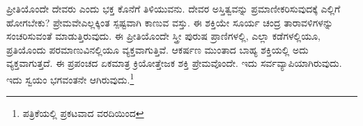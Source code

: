 ಪ್ರೀತಿಯೊಂದೇ ದೇವರು ಎಂದು ಭಕ್ತ ಕೊನೆಗೆ ತಿಳಿಯುವನು. ದೇವರ ಅಸ್ತಿತ್ವವನ್ನು ಪ್ರಮಾಣೀಕರಿಸುವುದಕ್ಕೆ ಎಲ್ಲಿಗೆ ಹೋಗಬೇಕು? ಪ್ರೇಮವೇ\break ಎಲ್ಲಕ್ಕಿಂತ ಸ್ಪಷ್ಟವಾಗಿ ಕಾಣುವ ವಸ್ತು. ಈ ಶಕ್ತಿಯೇ ಸೂರ್ಯ ಚಂದ್ರ ತಾರಾವಳಿಗಳನ್ನು ಸಂಚರಿಸುವಂತೆ ಮಾಡುತ್ತಿರುವುದು. ಈ ಪ್ರೀತಿಯೊಂದೇ ಸ್ತ್ರೀ ಪುರುಷ ಪ್ರಾಣಿಗಳಲ್ಲಿ, ಎಲ್ಲಾ ಕಡೆಗಳಲ್ಲಿಯೂ, ಪ್ರತಿಯೊಂದು ಪರಮಾಣುವಿನಲ್ಲಿಯೂ ವ್ಯಕ್ತವಾಗುತ್ತಿವೆ. ಆಕರ್ಷಣ ಮುಂತಾದ ಬಾಹ್ಯ ಶಕ್ತಿಯಲ್ಲಿ ಅದು ವ್ಯಕ್ತವಾಗುತ್ತದೆ. ಈ ಪ್ರಪಂಚದ ಏಕಮಾತ್ರ ಕ್ರಿಯೋತ್ತೇಜಕ ಶಕ್ತಿ ಪ್ರೇಮವೊಂದೇ. ಇದು ಸರ್ವವ್ಯಾಪಿಯಾಗಿರುವುದು. ಇದು ಸ್ವಯಂ ಭಗವಂತನೇ ಆಗಿರುವುದು.\footnote{ ಪತ್ರಿಕೆಯಲ್ಲಿ ಪ್ರಕಟವಾದ ವರದಿಯಿಂದ}

